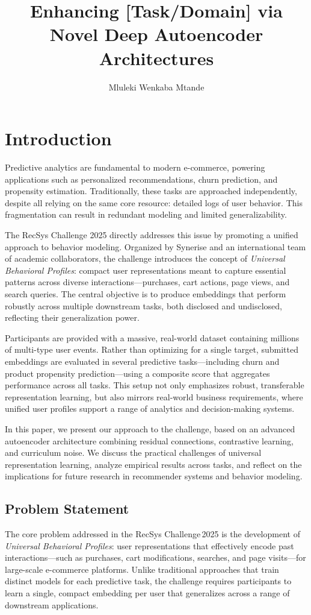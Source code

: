 \documentclass[sigconf]{acmart}
\title{Enhancing [Task/Domain] via Novel Deep Autoencoder Architectures}
\author{Mluleki Wenkaba Mtande}
\affiliation{
  \institution{[Your Institution or Independent Researcher]}
  \city{}
  \country{}
}
\begin{document}
\maketitle

\section{Introduction}
Predictive analytics are fundamental to modern e-commerce, powering applications such as personalized recommendations, churn prediction, and propensity estimation. Traditionally, these tasks are approached independently, despite all relying on the same core resource: detailed logs of user behavior. This fragmentation can result in redundant modeling and limited generalizability.

The RecSys Challenge 2025 \cite{recsys2025} directly addresses this issue by promoting a unified approach to behavior modeling. Organized by Synerise and an international team of academic collaborators, the challenge introduces the concept of \emph{Universal Behavioral Profiles}: compact user representations meant to capture essential patterns across diverse interactions—purchases, cart actions, page views, and search queries. The central objective is to produce embeddings that perform robustly across multiple downstream tasks, both disclosed and undisclosed, reflecting their generalization power.

Participants are provided with a massive, real-world dataset containing millions of multi-type user events. Rather than optimizing for a single target, submitted embeddings are evaluated in several predictive tasks—including churn and product propensity prediction—using a composite score that aggregates performance across all tasks. This setup not only emphasizes robust, transferable representation learning, but also mirrors real-world business requirements, where unified user profiles support a range of analytics and decision-making systems.

In this paper, we present our approach to the challenge, based on an advanced autoencoder architecture combining residual connections, contrastive learning, and curriculum noise. We discuss the practical challenges of universal representation learning, analyze empirical results across tasks, and reflect on the implications for future research in recommender systems and behavior modeling.

\subsection{Problem Statement}
The core problem addressed in the RecSys Challenge 2025 is the development of \emph{Universal Behavioral Profiles}: user representations that effectively encode past interactions—such as purchases, cart modifications, searches, and page visits—for large-scale e-commerce platforms. Unlike traditional approaches that train distinct models for each predictive task, the challenge requires participants to learn a single, compact embedding per user that generalizes across a range of downstream applications.
\end{document}
